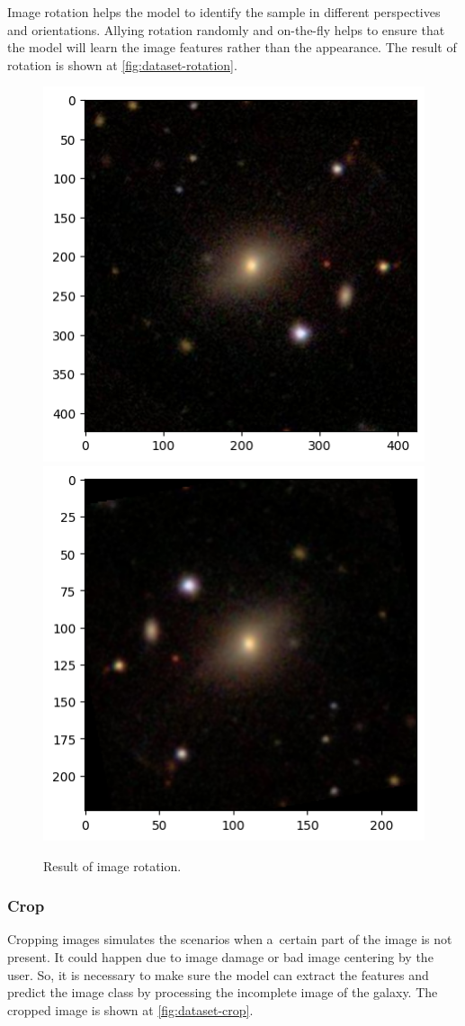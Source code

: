 Image rotation helps the model to identify the sample in different perspectives and orientations. Allying rotation randomly and on-the-fly helps to ensure that the model will learn the image features rather than the appearance. The result of rotation is shown at \autoref{fig:dataset-rotation}.

\begin{figure}[htbp]\centering
  \centering
  \includegraphics[width=0.5\linewidth]{obrazky-figures/03-dataset/orig.png}\hfill
  \includegraphics[width=0.5\linewidth]{obrazky-figures/03-dataset/rotation.png}
  \caption{Result of image rotation.}
  \label{fig:dataset-rotation}
\end{figure}

\subsubsection*{Crop}

Cropping images simulates the scenarios when a~certain part of the image is not present. It could happen due to image damage or bad image centering by the user. So, it is necessary to make sure the model can extract the features and predict the image class by processing the incomplete image of the galaxy. The cropped image is shown at \autoref{fig:dataset-crop}.

